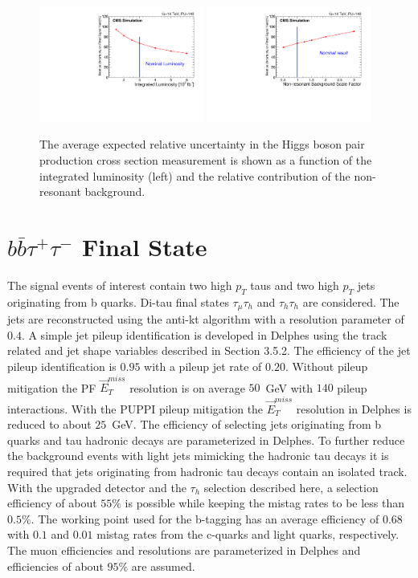 \begin{figure}[h]
  \centering
  \includegraphics[width=0.48\textwidth]{figures_chapter6/XSUncertaintyVsLumi.pdf}
 \includegraphics[width=0.48\textwidth]{figures_chapter6/XSUncertaintyVsNonResBkgScaleFactor.pdf} 
  \caption {The average expected relative uncertainty in the Higgs boson pair production cross section measurement is shown  as a function of the integrated luminosity (left) and the relative contribution of the non-resonant background.}
  \label{fig:LumiScan}
\end{figure}

\section{$b\bar{b}\tau^{+}\tau^{-}$ Final State}

The signal events of interest contain two high $p_{T}$ taus and two high $p_{T}$ jets originating from b quarks. Di-tau final states $\tau_{\mu}\tau_{h}$ and $\tau_{h}\tau_{h}$ are considered. The jets are reconstructed using the anti-kt algorithm with a resolution parameter of $0.4$. A simple jet pileup identification is developed in Delphes using the track related and jet shape variables described in Section 3.5.2. The efficiency of the jet pileup identification is $0.95$ with a pileup jet rate of $0.20$. Without pileup mitigation the PF $\vec{E}_{T}^{miss}$ resolution is on average $50$~GeV with $140$ pileup interactions. With the PUPPI pileup mitigation the $\vec{E}_{T}^{miss}$ resolution in Delphes is reduced to about $25$~GeV.  The efficiency of selecting jets originating from b quarks and tau hadronic decays are parameterized in Delphes. To further reduce the background events with light jets mimicking the hadronic tau decays it is required that jets originating from hadronic tau decays contain an isolated track. With the upgraded \phasetwo detector and the $\tau_{h}$ selection described here, a selection efficiency of about $55\%$ is possible while keeping the mistag rates to be less than $0.5\%$. The working point used for the b-tagging has an average efficiency of $0.68$ with $0.1$ and $0.01$ mistag rates from the c-quarks and light quarks, respectively.  The muon efficiencies and resolutions are parameterized in Delphes and efficiencies of about $95\%$ are assumed.

